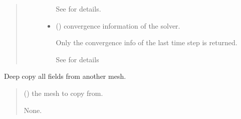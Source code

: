 \documentclass[letterpaper,10pt,english]{sphinxmanual}
\begin{document}
\begin{fulllineitems}
\begin{fulllineitems}
\begin{quote}
\begin{description}
\begin{itemize}
\sphinxAtStartPar
See {\hyperref[\detokenize{_autosummary/nirfasterff.base.data.TPSFdata:nirfasterff.base.data.TPSFdata}]{}} for details.

\item {} 
\sphinxAtStartPar
{} () \textendash{} convergence information of the solver.

\sphinxAtStartPar
Only the convergence info of the last time step is returned.

\sphinxAtStartPar
See {\hyperref[\detokenize{_autosummary/nirfasterff.utils.ConvergenceInfo:nirfasterff.utils.ConvergenceInfo}]{}} for details

\end{itemize}


\end{description}\end{quote}

\end{fulllineitems}


\begin{fulllineitems}
\label{\detokenize{_autosummary/nirfasterff.base.stnd_mesh.stndmesh:nirfasterff.base.stnd_mesh.stndmesh.from_copy}}
\pysigstartsignatures
\pysiglinewithargsret
{}
{}
{}
\pysigstopsignatures
\sphinxAtStartPar
Deep copy all fields from another mesh.
\begin{quote}\begin{description}
\sphinxAtStartPar
{} () \textendash{} the mesh to copy from.

\sphinxAtStartPar
None.

\end{description}\end{quote}

\end{fulllineitems}



\end{fulllineitems}
\end{document}
